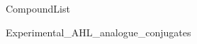 \documentclass[10pt,a4paper]{article}
\begin{document}
	

{CompoundList}

\tableofcontents




{Experimental_AHL_analogue_conjugates}

%
\end{document}
